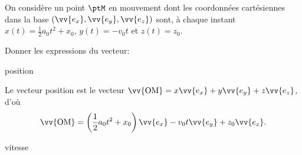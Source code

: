 



\hauteurLargeurCadreReponse		{1.5cm}{3.5cm}
\initialisationEntrainement

On considère un point $\ptM$ en mouvement dont les coordonnées cartésiennes dans la base $(\vv{e_x},\vv{e_y},\vv{e_z})$ sont, à chaque instant $x(t)=\frac12 a_0t^2 + x_0$, $y(t)=-v_0t$ et $z(t) = z_0$. 

Donner les expressions du vecteur:

\debutEntrainement

\begin{enonce}
	 position
\end{enonce}


\begin{corrige}
	Le vecteur position est le vecteur $\vv{\text{OM}}=x\vv{e_x}+y\vv{e_y}+z\vv{e_z}$, d'où 
	\[
	\vv{\text{OM}} =\left(\frac12 a_0 t^2 + x_0\right)\vv{e_x} - v_0 t \vv{e_y} + z_0 \vv{e_z}.
	\]
\end{corrige}



\begin{enonce}
	  vitesse
\end{enonce}

